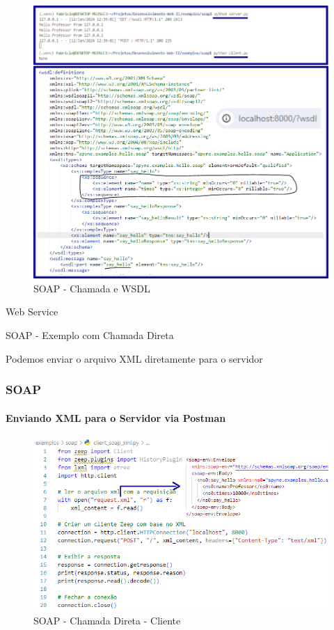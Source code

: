 \documentclass[
	9pt, %
	t, %
]{beamer}
\begin{document}
\begin{frame}[plain, c]

	\begin{figure}
		\includegraphics[width=0.75\linewidth]{soap_example.png}
		\caption{SOAP - Chamada e WSDL}
		\label{fig:soap_example}
	\end{figure}

\end{frame}

\begin{frame}
	\begin{center}

		\bigskip\bigskip\bigskip\bigskip %
		{\Large Web Service}

		\bigskip\bigskip %
		{\Huge SOAP - Exemplo com Chamada Direta}

		\smallskip
		{\small Podemos enviar o arquivo XML diretamente para o servidor}
	\end{center}

\end{frame}

\begin{frame}[fragile]
	\frametitle{SOAP}
	\framesubtitle{Enviando XML para o Servidor via Postman}

	\begin{figure}
		\includegraphics[width=0.9\linewidth]{client_xml.PNG}
		\caption{SOAP - Chamada Direta - Cliente}
		\label{fig:soap_client_xml}
	\end{figure}

\end{frame}
\end{document}
